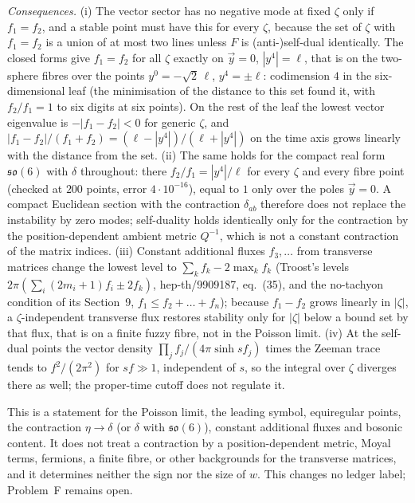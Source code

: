 \emph{Consequences.} (i) The vector sector has no negative mode at fixed \(\zeta\) only if \(f_1=f_2\), and a stable point must have this for every \(\zeta\), because the set of \(\zeta\) with \(f_1=f_2\) is a union of at most two lines unless \(F\) is (anti-)self-dual identically. The closed forms give \(f_1=f_2\) for all \(\zeta\) exactly on \(\vec y=0\), \(|y^4|=\ell\), that is on the two-sphere fibres over the points \(y^0=-\sqrt2\,\ell\), \(y^4=\pm\ell\): codimension \(4\) in the six-dimensional leaf (the minimisation of the distance to this set found it, with \(f_2/f_1=1\) to six digits at six points). On the rest of the leaf the lowest vector eigenvalue is \(-|f_1-f_2|<0\) for generic \(\zeta\), and \(|f_1-f_2|/(f_1+f_2)=(\ell-|y^4|)/(\ell+|y^4|)\) on the time axis grows linearly with the distance from the set. (ii) The same holds for the compact real form \(\mathfrak{so}(6)\) with \(\delta\) throughout: there \(f_2/f_1=|y^4|/\ell\) for every \(\zeta\) and every fibre point (checked at \(200\) points, error \(4\cdot10^{-16}\)), equal to \(1\) only over the poles \(\vec y=0\). A compact Euclidean section with the contraction \(\delta_{ab}\) therefore does not replace the instability by zero modes; self-duality holds identically only for the contraction by the position-dependent ambient metric \(Q^{-1}\), which is not a constant contraction of the matrix indices. (iii) Constant additional fluxes \(f_3,\dots\) from transverse matrices change the lowest level to \(\sum_kf_k-2\max_kf_k\) (Troost's levels \(2\pi(\sum_i(2m_i+1)f_i\pm2f_k)\), hep-th/9909187, eq.~(35), and the no-tachyon condition of its Section~9, \(f_1\le f_2+\dots+f_n\)); because \(f_1-f_2\) grows linearly in \(|\zeta|\), a \(\zeta\)-independent transverse flux restores stability only for \(|\zeta|\) below a bound set by that flux, that is on a finite fuzzy fibre, not in the Poisson limit. (iv) At the self-dual points the vector density \(\prod_j f_j/(4\pi\sinh sf_j)\) times the Zeeman trace tends to \(f^2/(2\pi^2)\) for \(sf\gg1\), independent of \(s\), so the integral over \(\zeta\) diverges there as well; the proper-time cutoff does not regulate it.

This is a statement for the Poisson limit, the leading symbol, equiregular points, the contraction \(\eta\to\delta\) (or \(\delta\) with \(\mathfrak{so}(6)\)), constant additional fluxes and bosonic content. It does not treat a contraction by a position-dependent metric, Moyal terms, fermions, a finite fibre, or other backgrounds for the transverse matrices, and it determines neither the sign nor the size of \(w\). This changes no ledger label; Problem~F remains open.
